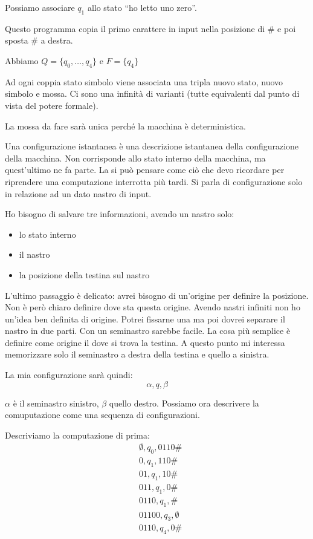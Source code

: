 Possiamo associare $q_{1}$ allo stato ``ho letto uno zero''.

Questo programma copia il primo carattere in input nella posizione di \# e poi sposta \# a destra.

Abbiamo $Q = \{q_{0},\dotsc,q_{4}\}$ e $F = \{q_{4}\}$

Ad ogni coppia stato simbolo viene associata una tripla nuovo stato, nuovo simbolo e mossa. Ci sono
una infinità di varianti (tutte equivalenti dal punto di vista del potere formale).

La mossa da fare sarà unica perché la macchina è deterministica.

Una configurazione istantanea è una descrizione istantanea della configurazione della macchina. Non
corrisponde allo stato interno della macchina, ma quest'ultimo ne fa parte. La si può pensare come
ciò che devo ricordare per riprendere una computazione interrotta più tardi. Si parla di
configurazione solo in relazione ad un dato nastro di input.

Ho bisogno di salvare tre informazioni, avendo un nastro solo:
\begin{itemize}
    \item lo stato interno
    \item il nastro
    \item la posizione della testina sul nastro
\end{itemize}

L'ultimo passaggio è delicato: avrei bisogno di un'origine per definire la posizione. Non è però
chiaro definire dove sta questa origine. Avendo nastri infiniti non ho un'idea ben definita di
origine. Potrei fissarne una ma poi dovrei separare il nastro in due parti. Con un seminastro
sarebbe facile. La cosa più semplice è definire come origine il dove si trova la testina. A questo
punto mi interessa memorizzare solo il seminastro a destra della testina e quello a sinistra.

La mia configurazione sarà quindi:
\begin{equation*}
    \alpha,q,\beta
\end{equation*}

$\alpha$ è il seminastro sinistro, $\beta$ quello destro. Possiamo ora descrivere la comuputazione come
una sequenza di configurazioni.

Descriviamo la computazione di prima:
\begin{align*}
    &\emptyset,q_{0},0110\#\\
    &0,q_{1},110\#\\
    &01,q_{1},10\#\\
    &011,q_{1},0\#\\
    &0110,q_{1},\#\\
    &01100,q_{3},\emptyset\\
    &0110,q_{4},0\#
\end{align*}

